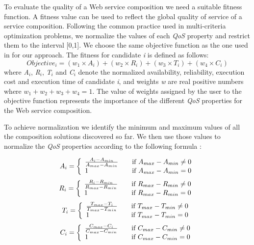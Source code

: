 To evaluate the quality of a Web service composition we need a suitable fitness function. A fitness value can be used to reflect the global quality of service of a service composition. Following the common practice  \cite{19,14,4} used in multi-criteria optimization problems, we normalize the values of each \emph{QoS} property and restrict them to the interval [0,1]. We choose the same objective function as the one used in \cite{19,4} for our approach. The fitness for candidate \emph{i} is defined as follows:
\begin{equation}
Objective_{i}=(w_{1} \times A_{i}) + (w_{2} \times R_{i}) + (w_{3} \times T_{i}) + (w_{4} \times C_{i})
\end{equation}
\noindent
where \emph{A$_{i}$}, \emph{R$_{i}$}, \emph{T$_{i}$} and  \emph{C$_{i}$} denote the normalized availability, reliability,  execution cost and  execution time of candidate \emph{i}, and weights \emph{w} are real positive numbers where $w_{1} + w_{2} + w_{3} + w_{4} = 1$. The value of weights assigned by the user to the objective function represents the importance of the different \emph{QoS} properties for the Web service composition. \par

To achieve normalization we identify the minimum and maximum values of all the composition solutions discovered so far. We then use those values to normalize the \emph{QoS} properties according to the following formula \cite{4}:


\[A_i = \left\{
\begin{array}{l l} 
    \frac{A_i - A_{min}}{A_{max} - A_{min}}      & \quad \text{if  } A_{max} - A_{min} \neq 0\\
    1  & \quad \text{if  } A_{max} - A_{min} = 0\\
\end{array} \right. \]\label{eq:2}
\[R_i = \left\{
\begin{array}{l l} 
    \frac{R_i - R_{min}}{R_{max} - R_{min}}      & \quad \text{if  } R_{max} - R_{min} \neq 0\\
    1  & \quad \text{if  } R_{max} - R_{min} = 0\\
\end{array} \right. \]\label{eq:2}
\[T_i = \left\{
\begin{array}{l l} 
    \frac{T_{max} - T_i}{T_{max} - T_{min}}      & \quad \text{if  } T_{max} - T_{min} \neq 0\\
    1  & \quad \text{if  } T_{max} - T_{min} = 0\\
\end{array} \right. \]\label{eq:2}
\[C_i = \left\{
\begin{array}{l l} 
    \frac{C_{max} - C_i}{C_{max} - C_{min}}      & \quad \text{if  } C_{max} - C_{min} \neq 0\\
    1  & \quad \text{if  } C_{max} - C_{min} = 0\\
\end{array} \right. \]\label{eq:2}

